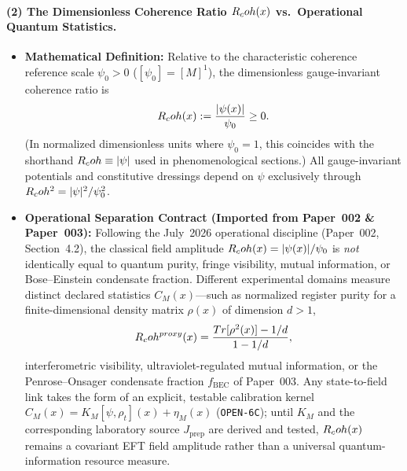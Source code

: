 \paragraph{(2) The Dimensionless Coherence Ratio $R_coh(x)$ vs.\ Operational Quantum Statistics.}
\begin{itemize}
  \item \textbf{Mathematical Definition:} Relative to the characteristic coherence reference scale $\psi_0 > 0$ ($[\psi_0] = [M]^1$), the dimensionless gauge-invariant coherence ratio is
  \begin{equation}
  R_coh(x) := \frac{|\psi(x)|}{\psi_0} \ge 0.
  \label{eq:def_Rcoh_canonical}
  \end{equation}
  (In normalized dimensionless units where $\psi_0 = 1$, this coincides with the shorthand $R_coh \equiv |\psi|$ used in phenomenological sections.) All gauge-invariant potentials and constitutive dressings depend on $\psi$ exclusively through $R_coh^2 = |\psi|^2/\psi_0^2$.
  \item \textbf{Operational Separation Contract (Imported from Paper~002 \& Paper~003):} Following the July~2026 operational discipline (Paper~002, Section~4.2), the classical field amplitude $R_coh(x) = |\psi(x)|/\psi_0$ is \emph{not} identically equal to quantum purity, fringe visibility, mutual information, or Bose--Einstein condensate fraction. Different experimental domains measure distinct declared statistics $C_M(x)$---such as normalized register purity for a finite-dimensional density matrix $\rho(x)$ of dimension $d > 1$,
  \begin{equation}
  R_coh^{proxy}(x) = \frac{Tr[\rho^2(x)] - 1/d}{1 - 1/d},
  \label{eq:purity_proxy_def}
  \end{equation}
  interferometric visibility, ultraviolet-regulated mutual information, or the Penrose--Onsager condensate fraction $f_{\mathrm{BEC}}$ of Paper~003. Any state-to-field link takes the form of an explicit, testable calibration kernel $C_M(x) = K_M[\psi,\rho_t](x) + \eta_M(x)$ (\texttt{OPEN-6C}); until $K_M$ and the corresponding laboratory source $J_{\mathrm{prep}}$ are derived and tested, $R_coh(x)$ remains a covariant EFT field amplitude rather than a universal quantum-information resource measure.
\end{itemize}

